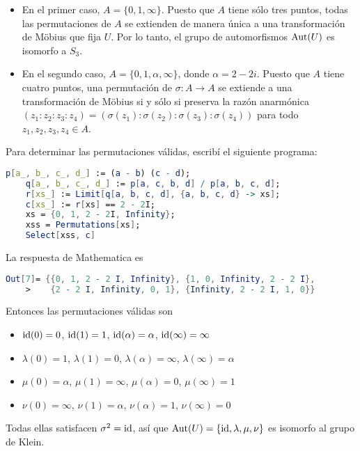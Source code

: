 \begin{solution}
\begin{enumerate}[label=\alph*)]
    \begin{itemize}
        \item En el primer caso, $A = \{ 0, 1, \infty \}$. Puesto que $A$ tiene sólo tres puntos, todas las permutaciones de $A$ se extienden de manera única a una transformación de Möbius que fija $U$. Por lo tanto, el grupo de automorfismos $\operatorname{Aut}(U)$ es isomorfo a $S_3$.
        
        \item En el segundo caso, $A = \{ 0, 1, \alpha, \infty \}$, donde $\alpha = 2 - 2i$. Puesto que $A$ tiene cuatro puntos, una permutación de $\sigma : A \to A$ se extiende a una transformación de Möbius si y sólo si preserva la razón anarmónica $(z_1 : z_2 : z_3 : z_4) = (\sigma(z_1) : \sigma(z_2) : \sigma(z_3) : \sigma(z_4))$ para todo $z_1, z_2, z_3, z_4 \in A$.
    \end{itemize}
    
    Para determinar las permutaciones válidas, escribí el siguiente programa:
    \begin{lstlisting}[language=Mathematica]
    p[a_, b_, c_, d_] := (a - b) (c - d);
    q[a_, b_, c_, d_] := p[a, c, b, d] / p[a, b, c, d];
    r[xs_] := Limit[q[a, b, c, d], {a, b, c, d} -> xs];
    c[xs_] := r[xs] == 2 - 2I;
    xs = {0, 1, 2 - 2I, Infinity};
    xss = Permutations[xs];
    Select[xss, c]
    \end{lstlisting}
    
    La respuesta de Mathematica es
    \begin{lstlisting}[language=Mathematica]
    Out[7]= {{0, 1, 2 - 2 I, Infinity}, {1, 0, Infinity, 2 - 2 I},
    >    {2 - 2 I, Infinity, 0, 1}, {Infinity, 2 - 2 I, 1, 0}}
    \end{lstlisting}
    
    Entonces las permutaciones válidas son
    \begin{itemize}
        \item $\operatorname{id}(0) = 0$, $\operatorname{id}(1) = 1$, $\operatorname{id}(\alpha) = \alpha$, $\operatorname{id}(\infty) = \infty$
        \item $\lambda(0) = 1$, $\lambda(1) = 0$, $\lambda(\alpha) = \infty$, $\lambda(\infty) = \alpha$
        \item $\mu(0) = \alpha$, $\mu(1) = \infty$, $\mu(\alpha) = 0$, $\mu(\infty) = 1$
        \item $\nu(0) = \infty$, $\nu(1) = \alpha$, $\nu(\alpha) = 1$, $\nu(\infty) = 0$
    \end{itemize}
    
    Todas ellas satisfacen $\sigma^2 = \operatorname{id}$, así que $\operatorname{Aut}(U) = \{ \operatorname{id}, \lambda, \mu, \nu \}$ es isomorfo al grupo de Klein.
    

\end{enumerate}
\end{solution}
